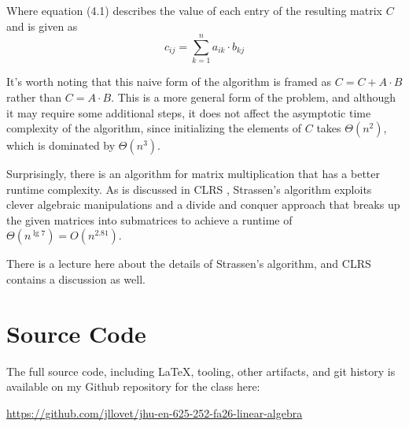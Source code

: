 \documentclass[10pt,letterpaper,final]{report}
\begin{document}
Where equation (4.1) describes the value of each entry of the resulting matrix $C$ and is given as \[
c_{ij} = \sum_{k=1}^{n}a_{ik} \cdot b_{kj}
\]

It's worth noting that this naive form of the algorithm is framed as $C = C + A \cdot B$ rather than $C = A \cdot B$. This is a more general form of the problem, and although it may require some additional steps, it does not affect the asymptotic time complexity of the algorithm, since initializing the elements of $C$ takes $\Theta(n^2)$, which is dominated by $\Theta(n^3)$.

Surprisingly, there is an algorithm for matrix multiplication that has a better runtime complexity. As is discussed in CLRS \cite[Ch. 4.2, pp. 85-89]{CormenEtAl2022IntroductionToAlgorithms}, Strassen's algorithm exploits clever algebraic manipulations and a divide and conquer approach that breaks up the given matrices into submatrices to achieve a runtime of $\Theta(n^{\lg7}) = O(n^{2.81})$.

There is a lecture here  about the details of Strassen's algorithm, and CLRS \cite{CormenEtAl2022IntroductionToAlgorithms} contains a discussion as well.

\pagebreak

\section*{Source Code}
The full source code, including LaTeX, tooling, other artifacts, and git history is available on my Github repository for the class here:
\begin{center}
  \url{https://github.com/jllovet/jhu-en-625-252-fa26-linear-algebra}
\end{center}

\printbibliography
\end{document}
